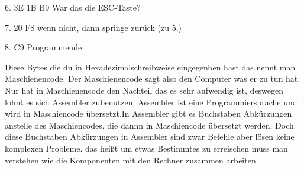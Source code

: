 \documentclass[10pt]{book}
\begin{document}
6. 3E 1B B9		War das die ESC-Taste?

7. 20 F8		wenn nicht, dann springe zurück (zu 5.)

8. C9			Programmende


Diese Bytes die du in Hexadezimalschreibweise eingegenben hast das nennt man Maschienencode. Der Maschienencode sagt also den Computer was er zu tun hat.
Nur hat in Maschienencode den Nachteil das es sehr aufwendig ist, deswegen lohnt
es sich Assembler zubenutzen. Assembler ist eine Programmiersprache und wird in 
Maschiencode übersetzt.In Assembler gibt es Buchstaben Abkürzungen anstelle des Maschiencodes, die dannn in Maschiencode übersetzt werden. Doch diese Buchstaben Abkürzungen in Assembler sind zwar Befehle aber lösen keine komplexen Probleme. das heißt um etwas Bestimmtes zu erreischen muss man verstehen wie die Komponenten mit den Rechner zusammen arbeiten.
\end{document}
